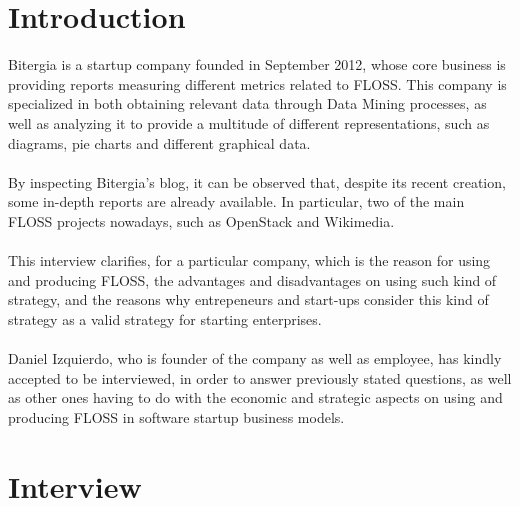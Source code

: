 \documentclass[11pt]{article}
\newcounter{question}
\newcounter{answer}
\begin{document}
\section{Introduction}
Bitergia is a startup company founded in September 2012, whose core business is providing reports measuring different metrics related to FLOSS. This company is specialized in both obtaining relevant data through Data Mining processes, as well as analyzing it to provide a multitude of different representations, such as diagrams, pie charts and different graphical data.\\
\\
By inspecting Bitergia's blog, it can be observed that, despite its recent creation, some in-depth reports are already available. In particular, two of the main FLOSS projects nowadays, such as OpenStack and Wikimedia.\\
\\
This interview clarifies, for a particular company, which is the reason for using and producing FLOSS, the advantages and disadvantages on using such kind of strategy, and the reasons why entrepeneurs and start-ups consider this kind of strategy as a valid strategy for starting enterprises.\\
\\
Daniel Izquierdo, who is founder of the company as well as employee, has kindly accepted to be interviewed, in order to answer previously stated questions, as well as other ones having to do with the economic and strategic aspects on using and producing FLOSS in software startup business models.
\section{Interview}

\end{document}
